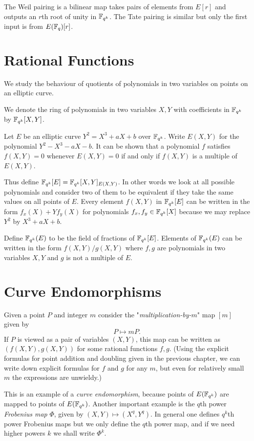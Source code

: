 The Weil pairing is a bilinear map
takes pairs of elements from $E[r]$ and outputs an $r$th root of unity
in $\mathbb{F}_{q^k}$. The Tate pairing is similar but only the first
input is from $E(\mathbb{F}_q)[r]$.

\section {Rational Functions}

We study the behaviour of quotients of polynomials in two variables on
points on an elliptic curve.

We denote the ring of polynomials in two variables $X,Y$
with coefficients in $\mathbb{F}_{q^k}$ by $\mathbb{F}_{q^k}[X,Y]$. 

Let $E$ be an elliptic curve $Y^2 = X^3 + aX + b$ over $\mathbb{F}_{q^k}$.
Write $E(X,Y)$ for the polynomial $Y^2 - X^3 - aX - b$.
It can be shown that a polynomial $f$ satisfies $f(X,Y) = 0$
whenever $E(X,Y) = 0$ if and only if $f(X,Y)$ is a multiple of $E(X,Y)$.

Thus define $\mathbb{F}_{q^k}[E] = \mathbb{F}_{q^k}[X,Y]_{E(X,Y)}$. In other words we look at all
possible polynomials and consider two of them to be
equivalent if they take the same values on all points of $E$.
Every element $f(X,Y)$ in $\mathbb{F}_{q^k}[E]$ can be written in the form
$f_x(X) + Y f_y(X)$ for polynomials $f_x, f_y \in \mathbb{F}_{q^k}[X]$ because
we may replace $Y^2$ by $X^3 + aX + b$.

Define $\mathbb{F}_{q^k}(E)$ to be the field of fractions of $\mathbb{F}_{q^k}[E]$.
Elements of $\mathbb{F}_{q^k}(E)$ can be written in the form
$f(X,Y) / g(X,Y)$ where $f, g$ are polynomials in two variables $X, Y$
and $g$ is not a multiple of $E$.

\section {Curve Endomorphisms}

Given a point $P$ and integer $m$ consider the "\emph{multiplication-by-$m$}"
map $[m]$ given by \[ P \mapsto m P . \]
If $P$ is viewed as a pair of variables $(X,Y)$, this map
can be written as $(f(X,Y), g(X,Y))$ for some rational functions $f,g$.
(Using the explicit formulas for point addition and doubling
given in the previous chapter, we can write down
explicit formulas for $f$ and $g$ for any $m$, but even for relatively
small $m$ the expressions are unwieldy.)

This is an example of a \emph{curve endomorphism}, because points of
$E(\mathbb{F}_{q^k})$ are mapped to points of $E(\mathbb{F}_{q^k})$. Another important example
is the $q$th power \emph{Frobenius map} $\Phi$,
given by $(X, Y) \mapsto (X^{q}, Y^{q})$. In general one defines
$q^k$th power Frobenius maps but we only define the $q$th power map,
and if we need higher powers $k$ we shall write $\Phi^k$.

